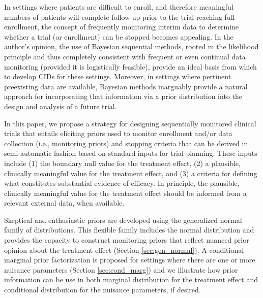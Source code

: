 \documentclass[useAMS,usenatbib,referee]{biom}
\begin{document}
In settings where patients are difficult to enroll, and therefore meaningful numbers of patients will complete follow up prior to 
the trial reaching full enrollment, the concept of frequently monitoring interim data to determine whether a trial 
(or enrollment) can be stopped becomes appealing. 
%
In the author's opinion, the use of Bayesian sequential methods, rooted in the likelihood principle and thus completely consistent with 
frequent or even continual data monitoring (provided it is logistically feasible), provide an ideal basis from which to develop CIDs 
for these settings.
%
Moreover, in settings where pertinent preexisting data are available, Bayesian methods inarguably provide a natural 
approach for incorporating that information via a prior distribution into the design and analysis of a future trial. 

In this paper, we propose a strategy for designing sequentially monitored clinical trials that entails eliciting 
priors used to monitor enrollment and/or data collection (i.e., monitoring priors) and stopping criteria that can 
be derived in semi-automatic fashion based on standard inputs for trial planning. 
%
These inputs include (1) the boundary null value for the treatment effect, (2) a plausible, clinically meaningful 
value for the treatment effect, and (3) a criteria for defining what constitutes substantial evidence of efficacy. 
%
In principle, the plausible, clinically meaningful value for the treatment effect should be informed from a 
relevant external data, when available. 


Skeptical and enthusiastic priors are developed using the generalized normal family of distributions. 
This flexible family includes the normal distribution and provides the capacity to construct monitoring 
priors that reflect nuanced prior opinion about the treatment effect (Section \ref{sec:gen_normal}). 
A conditional-marginal prior factorization is proposed for settings where there are one or more nuisance 
parameters (Section \ref{sec:cond_marg}) and we illustrate how prior information can be use in both marginal 
distribution for the treatment effect and conditional distribution for the nuisance parameters, if desired. 
\end{document}
